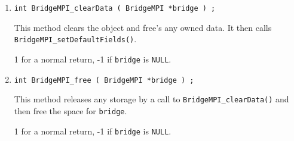 \begin{enumerate}
\item
\begin{verbatim}
int BridgeMPI_clearData ( BridgeMPI *bridge ) ;
\end{verbatim}
This method clears the object and free's any owned data.
It then calls {\tt BridgeMPI\_setDefaultFields()}.
\par {}
1 for a normal return, -1 if \texttt{bridge} is \texttt{NULL}.
\item
\begin{verbatim}
int BridgeMPI_free ( BridgeMPI *bridge ) ;
\end{verbatim}
This method releases any storage by a call to
{\tt BridgeMPI\_clearData()} and then free the space for {\tt bridge}.
\par {}
1 for a normal return, -1 if \texttt{bridge} is \texttt{NULL}.
\end{enumerate}
\par
